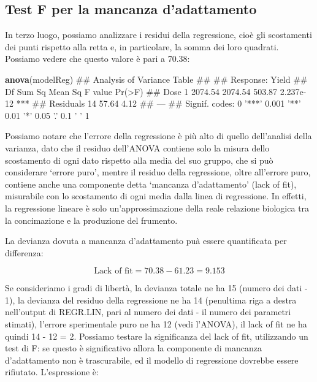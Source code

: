 \documentclass[a4paper,12pt,oneside]{book}
\newenvironment{Shaded}{\begin{snugshade}}{\end{snugshade}}
\newcommand{\KeywordTok}[1]{\textcolor[rgb]{0.13,0.29,0.53}{\textbf{#1}}}
\newcommand{\NormalTok}[1]{#1}
\theoremstyle{definition}
\theoremstyle{definition}
\theoremstyle{definition}
\theoremstyle{remark}
\begin{document}
\subsection{Test F per la mancanza
d'adattamento}\label{test-f-per-la-mancanza-dadattamento}

In terzo luogo, possiamo analizzare i residui della regressione, cioè
gli scostamenti dei punti rispetto alla retta e, in particolare, la
somma dei loro quadrati. Possiamo vedere che questo valore è pari a
70.38:

\begin{Shaded}
\begin{Highlighting}[]
\KeywordTok{anova}\NormalTok{(modelReg)}
\NormalTok{## Analysis of Variance Table}
\NormalTok{## }
\NormalTok{## Response: Yield}
\NormalTok{##           Df  Sum Sq Mean Sq F value    Pr(>F)    }
\NormalTok{## Dose       1 2074.54 2074.54  503.87 2.237e-12 ***}
\NormalTok{## Residuals 14   57.64    4.12                      }
\NormalTok{## ---}
\NormalTok{## Signif. codes:  0 '***' 0.001 '**' 0.01 '*' 0.05 '.' 0.1 ' ' 1}
\end{Highlighting}
\end{Shaded}

Possiamo notare che l'errore della regressione è più alto di quello
dell'analisi della varianza, dato che il residuo dell'ANOVA contiene
solo la misura dello scostamento di ogni dato rispetto alla media del
suo gruppo, che si può considerare `errore puro', mentre il residuo
della regressione, oltre all'errore puro, contiene anche una componente
detta `mancanza d'adattamento' (lack of fit), misurabile con lo
scostamento di ogni media dalla linea di regressione. In effetti, la
regressione lineare è solo un'approssimazione della reale relazione
biologica tra la concimazione e la produzione del frumento.

La devianza dovuta a mancanza d'adattamento puà essere quantificata per
differenza:

\[\textrm{Lack of fit} = 70.38 - 61.23 = 9.153\]

Se consideriamo i gradi di libertà, la devianza totale ne ha 15 (numero
dei dati - 1), la devianza del residuo della regressione ne ha 14
(penultima riga a destra nell'output di REGR.LIN, pari al numero dei
dati - il numero dei parametri stimati), l'errore sperimentale puro ne
ha 12 (vedi l'ANOVA), il lack of fit ne ha quindi 14 - 12 = 2. Possiamo
testare la significanza del lack of fit, utilizzando un test di F: se
questo è significativo allora la componente di mancanza d'adattamento
non è trascurabile, ed il modello di regressione dovrebbe essere
rifiutato. L'espressione è:
\end{document}

